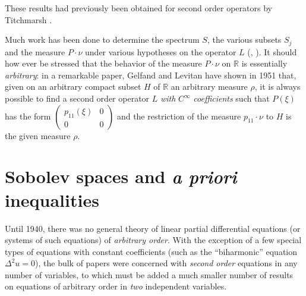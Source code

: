 \documentclass[12pt,a4paper,leqno,twoside]{extbook}
\newcommand{\R}{\mathbb{R}}
\begin{document}
These results had previously been obtained for second order operators by Titchmarsh \cite{212}.

Much work has been done to determine the spectrum \(S\), the various subsets \(S_j\) and the measure \(P \cdot \nu\) under various hypotheses on the operator \(L\) (\cite{062}, \cite{166}). It should how ever be stressed that the behavior of the measure \(P \cdot \nu\) on \(\R\) is essentially \emph{arbitrary}: in a remarkable paper, Gelfand and Levitan have shown in 1951 \cite{084} that, given on an arbitrary compact subset \(H\) of \(\R\) an arbitrary measure \(\rho\), it is always possible to find a second order operator \(L\) \emph{with} \(C^\infty\) \emph{coefficients} such that \(P(\xi)\) has the form
\(
    \begin{pmatrix}
        p_{11}(\xi) & 0 \\
        0           & 0
    \end{pmatrix}
\)
and the restriction of the measure \(p_{11} \cdot \nu\) to \(H\) is the given measure \(\rho\).

\section[Sobolev spaces and a priori inequalities]{Sobolev spaces and \emph{a priori} inequalities}
\label{sec:9.4}

Until 1940, there was no general theory of linear partial differential equations (or systems of such equations) of \emph{arbitrary order}. With the exception of a few special types of equations with constant coefficients (such as the ``biharmonic'' equation \(\Delta^2 u = 0\)), the bulk of papers were concerned with \emph{second order} equations in any number of variables, to which must be added a much smaller number of results on equations of arbitrary order in \emph{two} independent variables.
\end{document}
